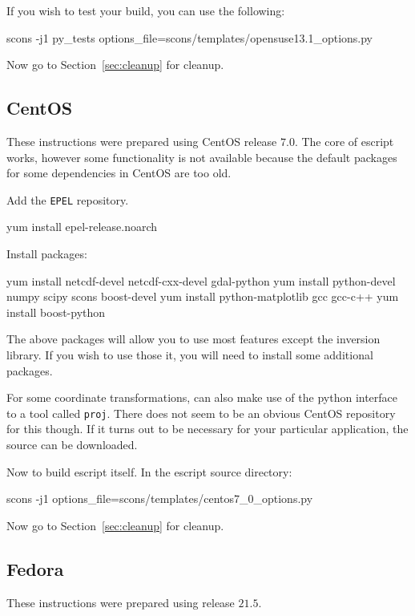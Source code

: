 \noindent If you wish to test your build, you can use the following:
\begin{shellCode}
scons -j1 py_tests options_file=scons/templates/opensuse13.1_options.py 
\end{shellCode}

\noindent Now go to Section~\ref{sec:cleanup} for cleanup.

\subsection{CentOS}\label{sec:centossrc}
These instructions were prepared using CentOS release $7.0$.
The core of escript works, however some functionality is not available because the default packages for some dependencies in CentOS are too old.

\noindent Add the \texttt{EPEL} repository.
\begin{shellCode}
yum install epel-release.noarch
\end{shellCode}

\noindent Install packages:
\begin{shellCode}
yum install netcdf-devel netcdf-cxx-devel gdal-python
yum install python-devel numpy scipy scons boost-devel
yum install python-matplotlib gcc gcc-c++
yum install boost-python 
\end{shellCode}

The above packages will allow you to use most features except 
the \downunder inversion library.
If you wish to use those it, you will need to install some additional packages.

\noindent For some coordinate transformations, \downunder can also make use of the python interface to a tool called \texttt{proj}.
There does not seem to be an obvious CentOS repository for this though.
If it turns out to be necessary for your particular application, the source can be downloaded. 

\noindent Now to build escript itself.
In the escript source directory:
\begin{shellCode}
scons -j1 options_file=scons/templates/centos7_0_options.py
\end{shellCode}

\noindent Now go to Section~\ref{sec:cleanup} for cleanup.

\subsection{Fedora}\label{sec:fedorasrc}
These instructions were prepared using release $21.5$.


